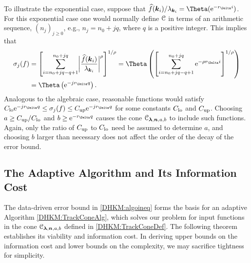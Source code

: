 \documentclass[USenglish]{article}
\theoremstyle{dgthm}
\theoremstyle{dgthm}
\theoremstyle{dgthm}
\theoremstyle{dgthm}
\theoremstyle{dgdef}
\theoremstyle{definition}
\newcommand{\hf}{\widehat{f}}
\newcommand{\lo}{\textup{lo}}
\newcommand{\up}{\textup{up}}
\newcommand{\E}{\textup{e}}
\newcommand{\biggabs}[1]{\ensuremath{\biggl \lvert #1 \biggr \rvert}}
\begin{document}
To illustrate the exponential case, suppose that $\hf(\bsk_i)/\lambda_{\bsk_i} = \Theta(\E^{-r_\Delta i})$.  For this exponential case one would normally define ${\mathcal{C}}$ in terms of an arithmetic sequence, $(n_j)_{j\ge 0}$, e.g., $n_j = n_0 + j q$, where $q$ is a positive integer.  This implies that 
\begin{align*}
    \sigma_j(f) &= \left[ \sum_{i=n_0 + j q -q + 1}^{n_0 + j q} \biggabs{\frac{\hf(\bsk_i)}{\lambda_{\bsk_i}}}^\rho \right]^{1/\rho}
    = \Theta \left( \left [ \sum_{i=n_0 + j q -q + 1}^{n_0 + j q} \E^{- \rho r_\Delta i} \right]^{1/\rho} \right) \\
    & = \Theta \left(  \E^{-j r_{\Delta} q} \right).
\end{align*}
Analogous to the algebraic case, reasonable functions would satisfy 
    $C_{\lo} \E^{-j r_{\Delta} q} \le \sigma_j(f) \le C_{\up} \E^{-j r_{\Delta} q}$
for some constants $C_{\lo}$ and $C_{\up}$.  Choosing $a \ge C_{\up}/C_{\lo} $  and $b \ge \E^{- r_{\Delta} q}$ causes the cone ${\mathcal{C}}_{\boldsymbol{\lambda},{\boldsymbol{n}},a,b}$ to include such functions.  Again, only the ratio of $C_{\up}$ to $C_{\lo}$ need be assumed to determine $a$, and choosing $b$ larger than necessary does not affect the order of the decay of the error bound.

\subsection{The Adaptive Algorithm and Its Information Cost} \label{DHKM:SecAdapAlgTrackDecay}

The data-driven error bound in \eqref{DHKM:algoineq} forms the basis for an adaptive Algorithm \ref{DHKM:TrackConeAlg}, which solves our problem for input functions in the cone ${\mathcal{C}}_{\boldsymbol{\lambda},{\boldsymbol{n}},a,b}$ defined in \eqref{DHKM:TrackConeDef}.  The following theorem establishes its viability and information cost. In deriving upper bounds on the information cost and lower bounds on the complexity, we may sacrifice tightness for simplicity.
\end{document}
